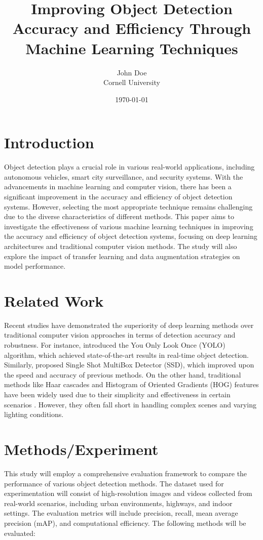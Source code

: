 \documentclass{article}
\title{Improving Object Detection Accuracy and Efficiency Through Machine Learning Techniques}
\author{John Doe \\ Cornell University}
\date{\today}
\begin{document}
\maketitle

\section{Introduction}
Object detection plays a crucial role in various real-world applications, including autonomous vehicles, smart city surveillance, and security systems. With the advancements in machine learning and computer vision, there has been a significant improvement in the accuracy and efficiency of object detection systems. However, selecting the most appropriate technique remains challenging due to the diverse characteristics of different methods. This paper aims to investigate the effectiveness of various machine learning techniques in improving the accuracy and efficiency of object detection systems, focusing on deep learning architectures and traditional computer vision methods. The study will also explore the impact of transfer learning and data augmentation strategies on model performance.

\section{Related Work}
Recent studies have demonstrated the superiority of deep learning methods over traditional computer vision approaches in terms of detection accuracy and robustness. For instance, \cite{YOLO} introduced the You Only Look Once (YOLO) algorithm, which achieved state-of-the-art results in real-time object detection. Similarly, \cite{SSD} proposed Single Shot MultiBox Detector (SSD), which improved upon the speed and accuracy of previous methods. On the other hand, traditional methods like Haar cascades and Histogram of Oriented Gradients (HOG) features have been widely used due to their simplicity and effectiveness in certain scenarios \cite{HaarCascades, HOGFeatures}. However, they often fall short in handling complex scenes and varying lighting conditions.

\section{Methods/Experiment}
This study will employ a comprehensive evaluation framework to compare the performance of various object detection methods. The dataset used for experimentation will consist of high-resolution images and videos collected from real-world scenarios, including urban environments, highways, and indoor settings. The evaluation metrics will include precision, recall, mean average precision (mAP), and computational efficiency. The following methods will be evaluated:
\end{document}
